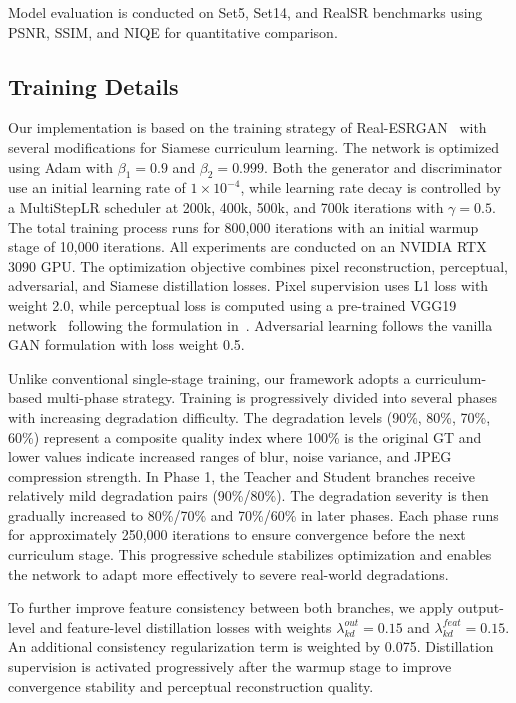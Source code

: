 \documentclass[conference]{IEEEtran}
\begin{document}
Model evaluation is conducted on Set5, Set14, and RealSR benchmarks using PSNR, SSIM, and NIQE for quantitative comparison.

\subsection{Training Details}
Our implementation is based on the training strategy of Real-ESRGAN~\cite{wang2021realesrgan} with several modifications for Siamese curriculum learning. The network is optimized using Adam with $\beta_1 = 0.9$ and $\beta_2 = 0.999$. Both the generator and discriminator use an initial learning rate of $1 \times 10^{-4}$, while learning rate decay is controlled by a MultiStepLR scheduler at 200k, 400k, 500k, and 700k iterations with $\gamma = 0.5$. The total training process runs for 800,000 iterations with an initial warmup stage of 10,000 iterations. All experiments are conducted on an NVIDIA RTX 3090 GPU. The optimization objective combines pixel reconstruction, perceptual, adversarial, and Siamese distillation losses. Pixel supervision uses L1 loss with weight 2.0, while perceptual loss is computed using a pre-trained VGG19 network~\cite{simonyan2014very} following the formulation in~\cite{johnson2016perceptual}. Adversarial learning follows the vanilla GAN formulation with loss weight 0.5.

Unlike conventional single-stage training, our framework adopts a curriculum-based multi-phase strategy. Training is progressively divided into several phases with increasing degradation difficulty. The degradation levels (90\%, 80\%, 70\%, 60\%) represent a composite quality index where 100\% is the original GT and lower values indicate increased ranges of blur, noise variance, and JPEG compression strength. In Phase 1, the Teacher and Student branches receive relatively mild degradation pairs (90\%/80\%). The degradation severity is then gradually increased to 80\%/70\% and 70\%/60\% in later phases. Each phase runs for approximately 250,000 iterations to ensure convergence before the next curriculum stage. This progressive schedule stabilizes optimization and enables the network to adapt more effectively to severe real-world degradations.

To further improve feature consistency between both branches, we apply output-level and feature-level distillation losses with weights $\lambda_{kd}^{out}=0.15$ and $\lambda_{kd}^{feat}=0.15$. An additional consistency regularization term is weighted by 0.075. Distillation supervision is activated progressively after the warmup stage to improve convergence stability and perceptual reconstruction quality.
\end{document}
